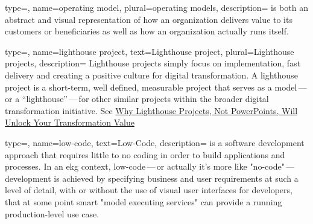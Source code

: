  {
    type=\glsdefaulttype,
    name={operating model},
    plural={operating models},
    description={%
        is both an abstract and visual representation of how an organization delivers value to its customers or
        beneficiaries as well as how an organization actually runs itself.
    }
}

 {
    type=\glsdefaulttype,
    name={lighthouse project},
    text={Lighthouse project},
    plural={Lighthouse projects},
    description={%
        Lighthouse projects simply focus on implementation, fast delivery and creating a positive culture for
        digital transformation.
        A lighthouse project is a short-term, well defined, measurable project that serves as a model\,---\,or
        a “lighthouse”\,---\,for other similar projects within the broader digital transformation initiative.
        See \href{https://www.contino.io/insights/why-lighthouse-projects-not-powerpoints-will-unlock-your-transformation-value}
        {Why Lighthouse Projects, Not PowerPoints, Will Unlock Your Transformation Value}
    }
}

 {
    type=\glsdefaulttype,
    name={low-code},
    text={Low-Code},
    description={%
        is a software development approach that requires little to no coding in order to build applications and processes.
        In an \gls{ekg} context, low-code\,---\,or actually it's more like "no-code"\,---\,development is achieved by
        specifying business and user requirements at such a level of detail, with or without the use of
        visual user interfaces for developers, that at some point smart "model executing services" can provide a running
        production-level use case.
    }
}
